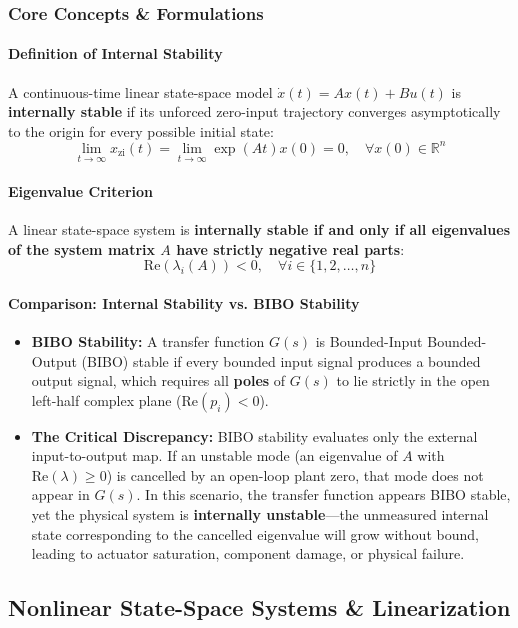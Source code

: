 \documentclass[12pt,onecolumn,twoside ]{article}
\begin{document}
	\subsubsection{Core Concepts \& Formulations}
	\paragraph{Definition of Internal Stability}
	A continuous-time linear state-space model $\dot{x}(t) = Ax(t) + Bu(t)$ is \textbf{internally stable} if its unforced zero-input trajectory converges asymptotically to the origin for every possible initial state: \[
	\lim_{t \to \infty} x_{\text{zi}}(t) = \lim_{t \to \infty} \exp(At)x(0) = 0, \quad \forall x(0) \in \mathbb{R}^n
	\]
	\paragraph{Eigenvalue Criterion}
	A linear state-space system is \textbf{internally stable if and only if all eigenvalues of the system matrix $A$ have strictly negative real parts}: \[
	\text{Re}(\lambda_i(A)) < 0, \quad \forall i \in \{1, 2, \dots, n\}
	\]
	\paragraph{Comparison: Internal Stability vs. BIBO Stability}
	\begin{itemize}
		\item
		\textbf{BIBO Stability:} A transfer function $G(s)$ is Bounded-Input Bounded-Output (BIBO) stable if every bounded input signal produces a bounded output signal, which requires all \textbf{poles} of $G(s)$ to lie strictly in the open left-half complex plane ($\text{Re}(p_i) < 0$).
		\item
		\textbf{The Critical Discrepancy:} BIBO stability evaluates only the external input-to-output map. If an unstable mode (an eigenvalue of $A$ with $\text{Re}(\lambda) \ge 0$) is cancelled by an open-loop plant zero, that mode does not appear in $G(s)$. In this scenario, the transfer function appears BIBO stable, yet the physical system is \textbf{internally unstable}—the unmeasured internal state corresponding to the cancelled eigenvalue will grow without bound, leading to actuator saturation, component damage, or physical failure.
	\end{itemize}
	
	\subsection{Nonlinear State-Space Systems \& Linearization}
\end{document}
